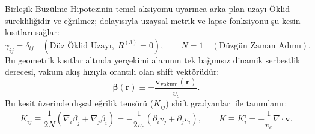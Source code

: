 Birleşik Büzülme Hipotezinin temel aksiyomu uyarınca arka plan uzayı Öklid sürekliliğidir ve eğrilmez; dolayısıyla uzaysal metrik ve lapse fonksiyonu şu kesin kısıtları sağlar:
\begin{equation}
    \gamma_{ij} = \delta_{ij} \quad (\text{Düz Öklid Uzayı}, \; R^{(3)} = 0), \qquad N = 1 \quad (\text{Düzgün Zaman Adımı}).
    \label{eq:duz_uzay_kisit}
\end{equation}
Bu geometrik kısıtlar altında yerçekimi alanının tek bağımsız dinamik serbestlik derecesi, vakum akış hızıyla orantılı olan shift vektörüdür:
\begin{equation}
    \boldsymbol{\beta}(\mathbf{r}) \equiv -\frac{\mathbf{v}_{\mathrm{vakum}}(\mathbf{r})}{v_c}.
    \label{eq:shift_vektor_tanim}
\end{equation}
Bu kesit üzerinde dışsal eğrilik tensörü ($K_{ij}$) shift gradyanları ile tanımlanır:
\begin{equation}
    K_{ij} \equiv \frac{1}{2N} \left( \nabla_i \beta_j + \nabla_j \beta_i \right) = -\frac{1}{2 v_c} \left( \partial_i v_j + \partial_j v_i \right), \qquad K \equiv K^i_i = -\frac{1}{v_c} \nabla \cdot \mathbf{v}.
    \label{eq:dissal_egrilik_shift}
\end{equation}

